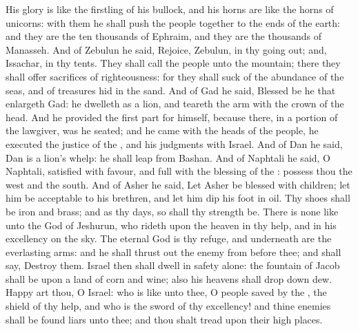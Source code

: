 \begin{biblechapter}
\verse His glory is like the firstling of his bullock, and his horns are like the horns of unicorns: with them he shall push the people together to the ends of the earth: and they are the ten thousands of Ephraim, and they are the thousands of Manasseh.
\verse And of Zebulun he said, Rejoice, Zebulun, in thy going out; and, Issachar, in thy tents.
\verse They shall call the people unto the mountain; there they shall offer sacrifices of righteousness: for they shall suck of the abundance of the seas, and of treasures hid in the sand.
\verse And of Gad he said, Blessed be he that enlargeth Gad: he dwelleth as a lion, and teareth the arm with the crown of the head.
\verse And he provided the first part for himself, because there, in a portion of the lawgiver, was he seated; and he came with the heads of the people, he executed the justice of the \LORD, and his judgments with Israel.
\verse And of Dan he said, Dan is a lion's whelp: he shall leap from Bashan.
\verse And of Naphtali he said, O Naphtali, satisfied with favour, and full with the blessing of the \LORD: possess thou the west and the south.
\verse And of Asher he said, Let Asher be blessed with children; let him be acceptable to his brethren, and let him dip his foot in oil.
\verse Thy shoes shall be iron and brass; and as thy days, so shall thy strength be.
\verse There is none like unto the God of Jeshurun, who rideth upon the heaven in thy help, and in his excellency on the sky.
\verse The eternal God is thy refuge, and underneath are the everlasting arms: and he shall thrust out the enemy from before thee; and shall say, Destroy them.
\verse Israel then shall dwell in safety alone: the fountain of Jacob shall be upon a land of corn and wine; also his heavens shall drop down dew.
\verse Happy art thou, O Israel: who is like unto thee, O people saved by the \LORD, the shield of thy help, and who is the sword of thy excellency! and thine enemies shall be found liars unto thee; and thou shalt tread upon their high places.
\end{biblechapter}

